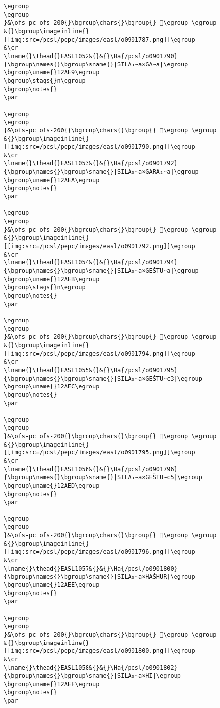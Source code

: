 \begin{verbatim}
\egroup
\egroup
}&\ofs-pc ofs-200{}\bgroup\chars{}\bgroup{} 󲸑\egroup \egroup
&{}\bgroup\imageinline{}[[img:src=/pcsl/pepc/images/easl/o0901787.png]]\egroup
&\cr
\lname{}\thead{}EASL1052&{}&{}\Ha{/pcsl/o0901790}{\bgroup\names{}\bgroup\sname{}|SILA₃∼a×GA∼a|\egroup
\bgroup\uname{}12AE9\egroup
\bgroup\stags{}n\egroup
\bgroup\notes{}
\par 

\egroup
\egroup
}&\ofs-pc ofs-200{}\bgroup\chars{}\bgroup{} 𒫩\egroup \egroup
&{}\bgroup\imageinline{}[[img:src=/pcsl/pepc/images/easl/o0901790.png]]\egroup
&\cr
\lname{}\thead{}EASL1053&{}&{}\Ha{/pcsl/o0901792}{\bgroup\names{}\bgroup\sname{}|SILA₃∼a×GARA₂∼a|\egroup
\bgroup\uname{}12AEA\egroup
\bgroup\notes{}
\par 

\egroup
\egroup
}&\ofs-pc ofs-200{}\bgroup\chars{}\bgroup{} 𒫪\egroup \egroup
&{}\bgroup\imageinline{}[[img:src=/pcsl/pepc/images/easl/o0901792.png]]\egroup
&\cr
\lname{}\thead{}EASL1054&{}&{}\Ha{/pcsl/o0901794}{\bgroup\names{}\bgroup\sname{}|SILA₃∼a×GEŠTU∼a|\egroup
\bgroup\uname{}12AEB\egroup
\bgroup\stags{}n\egroup
\bgroup\notes{}
\par 

\egroup
\egroup
}&\ofs-pc ofs-200{}\bgroup\chars{}\bgroup{} 𒫫\egroup \egroup
&{}\bgroup\imageinline{}[[img:src=/pcsl/pepc/images/easl/o0901794.png]]\egroup
&\cr
\lname{}\thead{}EASL1055&{}&{}\Ha{/pcsl/o0901795}{\bgroup\names{}\bgroup\sname{}|SILA₃∼a×GEŠTU∼c3|\egroup
\bgroup\uname{}12AEC\egroup
\bgroup\notes{}
\par 

\egroup
\egroup
}&\ofs-pc ofs-200{}\bgroup\chars{}\bgroup{} 𒫬\egroup \egroup
&{}\bgroup\imageinline{}[[img:src=/pcsl/pepc/images/easl/o0901795.png]]\egroup
&\cr
\lname{}\thead{}EASL1056&{}&{}\Ha{/pcsl/o0901796}{\bgroup\names{}\bgroup\sname{}|SILA₃∼a×GEŠTU∼c5|\egroup
\bgroup\uname{}12AED\egroup
\bgroup\notes{}
\par 

\egroup
\egroup
}&\ofs-pc ofs-200{}\bgroup\chars{}\bgroup{} 𒫭\egroup \egroup
&{}\bgroup\imageinline{}[[img:src=/pcsl/pepc/images/easl/o0901796.png]]\egroup
&\cr
\lname{}\thead{}EASL1057&{}&{}\Ha{/pcsl/o0901800}{\bgroup\names{}\bgroup\sname{}|SILA₃∼a×HAŠHUR|\egroup
\bgroup\uname{}12AEE\egroup
\bgroup\notes{}
\par 

\egroup
\egroup
}&\ofs-pc ofs-200{}\bgroup\chars{}\bgroup{} 𒫮\egroup \egroup
&{}\bgroup\imageinline{}[[img:src=/pcsl/pepc/images/easl/o0901800.png]]\egroup
&\cr
\lname{}\thead{}EASL1058&{}&{}\Ha{/pcsl/o0901802}{\bgroup\names{}\bgroup\sname{}|SILA₃∼a×HI|\egroup
\bgroup\uname{}12AEF\egroup
\bgroup\notes{}
\par 


\end{verbatim}
